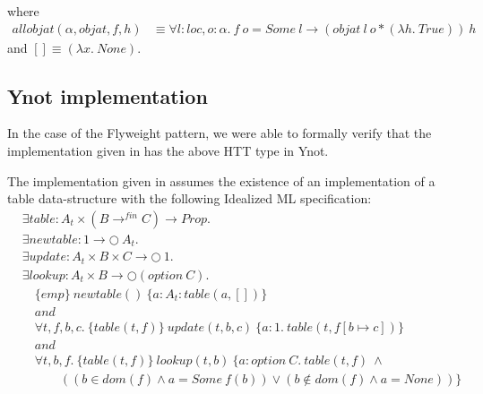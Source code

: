 \documentclass[a4paper,english]{article}
\newcommand{\PROP}[0]{Prop}
\newcommand{\MONAD}[0]{\bigcirc}
\newcommand{\AND}[0]{and}
\newcommand{\LOC}[0]{loc}
\newcommand{\OPTION}[0]{option}
\newcommand{\TRUE}[0]{True}
\begin{document}
where
\begin{align*}
allobjat(\alpha, objat, f, h) &\equiv \forall l : \LOC, o : \alpha.\ f\ o = Some\ l \rightarrow (objat\ l\ o * (\lambda h.\ \TRUE))\ h
\end{align*}
and $[] \equiv (\lambda x.\ None)$.

\subsection{Ynot implementation}

In the case of the Flyweight pattern, we were able to formally verify that the
implementation given in \cite{patterns} has the above HTT type in Ynot. 

The implementation given in \cite{patterns} assumes the existence of an
implementation of a table data-structure with the following Idealized ML
specification:
\begin{align*}
&\exists table : A_t \times (B \rightarrow^{fin} C) \rightarrow \PROP.\\
&\exists newtable: 1 \rightarrow \MONAD\ A_t.\\
&\exists update : A_t \times B \times C \rightarrow \MONAD\ 1.\\
&\exists lookup : A_t \times B \rightarrow \MONAD(\OPTION\ C).\\
&\quad \{ emp \}\ newtable()\ \{ a : A_t: table(a, [])\}\\
&\quad\AND\\
&\quad \forall t, f, b, c.\ \{ table(t, f) \}\ update(t, b, c)\ \{ a : 1.\ table(t, f[b \mapsto c]) \}\\
&\quad\AND\\
&\quad \forall t, b, f.\ \{ table(t, f) \}\ lookup(t, b)\ \{ a : option\ C.\ table(t, f)\ \land\\
&\quad\quad\quad ((b \in dom(f) \land a = Some\ f(b)) \lor (b \not\in dom(f) \land a = None)) \}
\end{align*}
\end{document}
